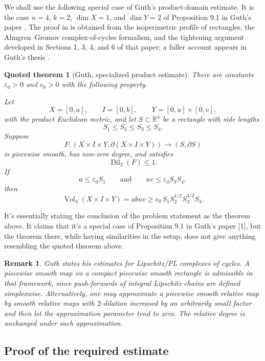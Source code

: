 \documentclass[12pt]{article}
\newtheorem{quotedtheorem}{Quoted theorem}
\newtheorem{remark}{Remark}
\newcommand{\R}{\mathbb{R}}
\newcommand{\Vol}{\operatorname{Vol}}
\newcommand{\Dil}{\operatorname{Dil}}
\newcommand{\review}[1]{\begin{reviewbox}#1\end{reviewbox}}
\begin{document}
We shall use the following special case of Guth's product-domain estimate.
It is the case \(n=4\), \(k=2\), \(\dim X=1\), and \(\dim Y=2\) of
Proposition 9.1 in Guth's paper \cite[Proposition 9.1]{GuthAreaExpanding}.
The proof in \cite{GuthAreaExpanding} is obtained from the isoperimetric
profile of rectangles, the Almgren--Gromov complex-of-cycles formalism,
and the tightening argument developed in Sections 1, 3, 4, and 6 of that
paper; a fuller account appears in Guth's thesis \cite{GuthThesis}.

\begin{quotedtheorem}[Guth, specialized product estimate]\label{qt:guth}
There are constants \(\varepsilon_0>0\) and \(c_0>0\) with the following
property.

Let
\[
X=[0,a],\qquad I=[0,b],\qquad Y=[0,u]\times[0,v],
\]
with the product Euclidean metric, and let \(S\subset \R^4\) be a rectangle
with side lengths
\[
S_1\leq S_2\leq S_3\leq S_4.
\]
Suppose
\[
F:(X\times I\times Y,\partial(X\times I\times Y))\longrightarrow
(S,\partial S)
\]
is piecewise smooth, has non-zero degree, and satisfies
\[
\Dil_2(F)\leq 1.
\]
If
\[
a\leq \varepsilon_0 S_1
\qquad\text{and}\qquad
uv\leq \varepsilon_0 S_3S_4,
\]
then
\[
\Vol_4(X\times I\times Y)
=abuv
\geq
c_0\,S_1S_2^{1/2}S_3^{3/2}S_4.
\]
\end{quotedtheorem}

\review{It's essentially stating the conclusion of the problem statement as the theorem above.  It claims that it's a special case of Proposition 9.1 in Guth's paper [1], but the theorem there, while having similarities in the setup, does not give anything resembling the quoted theorem above. }

\begin{remark}
Guth states his estimates for Lipschitz/PL complexes of cycles. A
piecewise smooth map on a compact piecewise smooth rectangle is admissible
in that framework, since push-forwards of integral Lipschitz chains are
defined simplexwise. Alternatively, one may approximate a piecewise smooth
relative map by smooth relative maps with \(2\)-dilation increased by an
arbitrarily small factor and then let the approximation parameter tend to
zero. The relative degree is unchanged under such approximation.
\end{remark}

\subsection{Proof of the required estimate}
\end{document}
